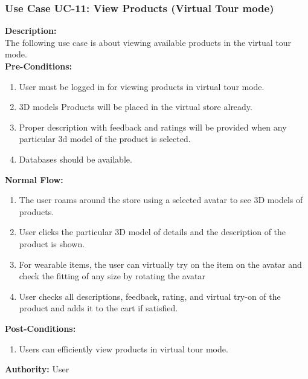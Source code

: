 \subsubsection{Use Case UC-11: View Products (Virtual Tour mode) }
\textbf{Description:}\\
The following use case is about viewing available products in the virtual tour mode. 
\\
\textbf{Pre-Conditions:}
\begin{enumerate}
    \item User must be logged in for viewing products in virtual tour mode.
 \item 3D models Products will be placed in the virtual store already. 
\item Proper description with feedback and ratings will be provided when any particular 3d model of the product is selected.
 \item Databases should be available. 
\end{enumerate}
\textbf{Normal Flow:}\\
\begin{enumerate}
\item The user roams around the store using a selected avatar to see 3D models of products. 
\item User clicks the particular 3D model of details and the description of the product is shown. 
\item For wearable items, the user can virtually try on the item on the avatar and check the fitting of any size by rotating the avatar 
\item User checks all descriptions, feedback, rating, and virtual try-on of the product and adds it to the cart if satisfied. 
\end{enumerate}
\textbf{Post-Conditions: }
\begin{enumerate}
\item	Users can efficiently view products in virtual tour mode.
\end{enumerate}
\textbf{Authority:}
User
